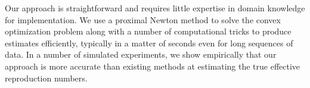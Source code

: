 Our approach is straightforward and requires little expertise in domain
knowledge for implementation. 
% 
We use a proximal Newton method to solve the convex optimization problem along
with a number of computational tricks to produce estimates efficiently,
typically in a matter of seconds even for long sequences of data.
In a number of simulated experiments, we show empirically that our approach is
more accurate than existing methods at estimating the true effective reproduction numbers. 

